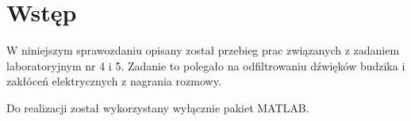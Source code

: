 \chapter{Wstęp}
W niniejszym sprawozdaniu opisany został przebieg prac związanych z zadaniem laboratoryjnym nr 4 i 5.
Zadanie to polegało na odfiltrowaniu dźwięków budzika i zakłóceń elektrycznych z nagrania rozmowy.

Do realizacji został wykorzystany wyłącznie pakiet MATLAB.
